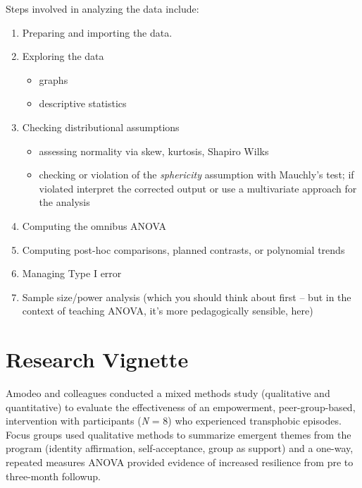 \documentclass[
  11pt,
]{book}
\providecommand{\tightlist}{%
  \setlength{\itemsep}{0pt}\setlength{\parskip}{0pt}}
\begin{document}
Steps involved in analyzing the data include:

\begin{enumerate}
\def\labelenumi{\arabic{enumi}.}
\tightlist
\item
  Preparing and importing the data.
\item
  Exploring the data

  \begin{itemize}
  \tightlist
  \item
    graphs
  \item
    descriptive statistics
  \end{itemize}
\item
  Checking distributional assumptions

  \begin{itemize}
  \tightlist
  \item
    assessing normality via skew, kurtosis, Shapiro Wilks
  \item
    checking or violation of the \emph{sphericity} assumption with Mauchly's test; if violated interpret the corrected output or use a multivariate approach for the analysis
  \end{itemize}
\item
  Computing the omnibus ANOVA
\item
  Computing post-hoc comparisons, planned contrasts, or polynomial trends
\item
  Managing Type I error
\item
  Sample size/power analysis (which you should think about first -- but in the context of teaching ANOVA, it's more pedagogically sensible, here)
\end{enumerate}

\hypertarget{research-vignette-6}{%
\section{Research Vignette}\label{research-vignette-6}}

Amodeo \citep{amodeo_empowering_2018} and colleagues conducted a mixed methods study (qualitative and quantitative) to evaluate the effectiveness of an empowerment, peer-group-based, intervention with participants (\emph{N} = 8) who experienced transphobic episodes. Focus groups used qualitative methods to summarize emergent themes from the program (identity affirmation, self-acceptance, group as support) and a one-way, repeated measures ANOVA provided evidence of increased resilience from pre to three-month followup.
\end{document}
